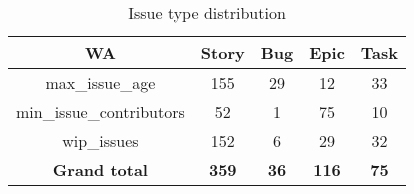 \begin{table}
\begin{center}
\begin{tabular}{|c|c|c|c|c|} 
\hline

WA & Story & Bug & Epic & Task \\ [0.5ex] 
\hline\hline

max\_issue\_age & 155 & 29 & 12 & 33 \\
min\_issue\_contributors & 52 & 1 & 75 & 10 \\
wip\_issues & 152 & 6 & 29 & 32 \\
\textbf{Grand total} & \textbf{359} & \textbf{36} & \textbf{116} & \textbf{75} \\
\hline
\end{tabular}
\caption{Issue type distribution}
\label{tab:issueConfig}
\end{center}
\end{table}